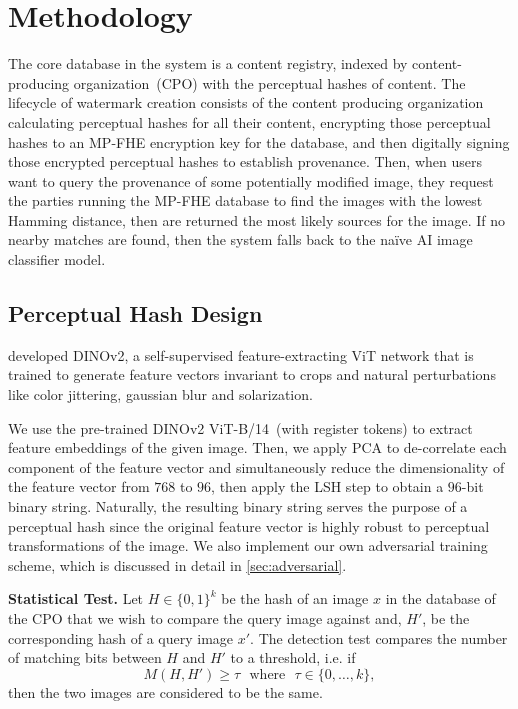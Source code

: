 \section{Methodology}
The core database in the system is a content registry, indexed by content-producing organization~(CPO) with the perceptual hashes of content. The lifecycle of watermark creation consists of the content producing organization calculating perceptual hashes for all their content, encrypting those perceptual hashes to an MP-FHE encryption key for the database, and then digitally signing those encrypted perceptual hashes to establish provenance. Then, when users want to query the provenance of some potentially modified image, they request the parties running the MP-FHE database to find the images with the lowest Hamming distance, then are returned the most likely sources for the image. If no nearby matches are found, then the system falls back to the na\"ive AI image classifier model. 

\subsection{Perceptual Hash Design}

\citet{oquab2023dinov2} developed DINOv2, a self-supervised feature-extracting ViT network that is trained to generate feature vectors invariant to crops and natural perturbations like color jittering, gaussian blur and solarization.

We use the pre-trained DINOv2 ViT-B/14~(with register tokens) to extract feature embeddings of the given image. Then, we apply PCA to de-correlate each component of the feature vector and simultaneously reduce the dimensionality of the feature vector from $768$ to $96$, then apply the LSH step to obtain a $96$-bit binary string. Naturally, the resulting binary string serves the purpose of a perceptual hash since the original feature vector is highly robust to perceptual transformations of the image. We also implement our own adversarial training scheme, which is discussed in detail in \autoref{sec:adversarial}.

\noindent\textbf{Statistical Test.}
Let $H\in \{ 0,1 \}^{k}$ be the hash of an image $x$ in the database of the CPO that we wish to compare the query image against and, $H'$, be the corresponding hash of a query image $x'$. The detection test compares the number of matching bits between $H$ and $H'$ to a threshold, i.e. if
\begin{equation} 
M\left(H,H'\right) \geq \tau \,\,\textrm{ where }\,\, \tau\in 
\{0,\ldots,k\}, %
\end{equation}
then the two images are considered to be the same.

